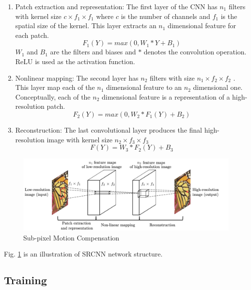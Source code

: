 \documentclass[12pt,journal,compsoc]{IEEEtran}
\begin{document}
\begin{enumerate}
  \item Patch extraction and representation: The first layer of the CNN has $n_1$ filters with kernel size $c \times f_1 \times f_1$ where $c$ is the number of channels and $f_1$ is the spatial size of the kernel. This layer extracts an $n_1$ dimensional feature for each patch. 
  \begin{equation}
  	F_1(Y) = max(0,W_1*Y+B_1)	
  \end{equation}
  $W_1$ and $B_1$ are the filters and biases and $*$ denotes the convolution operation. ReLU is used as the activation function.
  \item Nonlinear mapping: The second layer has $n_2$ filters with size $n_1 \times f_2 \times f_2$ . This layer map each of the $n_1$ dimensional feature to an $n_2$ dimensional one. Conceptually, each of the $n_2$ dimensional feature is a representation of a high-resolution patch.
  \begin{equation}
  	F_2(Y) = max(0,W_2*F_1(Y)+B_2)	
  \end{equation} 
  
  \item Reconstruction: The last convolutional layer produces the final high-resolution image with kernel size $n_2 \times f_3 \times f_3$
  \begin{equation}
  	F(Y) = W_3*F_2(Y)+B_3
  \end{equation}
  \end{enumerate}



\begin{figure}[!t] 
\normalsize
\centering
\includegraphics[width=7in]{2_SRCNN.png}
\vspace*{4pt} 
\caption{Sub-pixel Motion Compensation}
\label{fig_2}
\end{figure}


Fig. \ref{fig_2} is an illustration of SRCNN network structure.

\subsection{Training}
\end{document}
